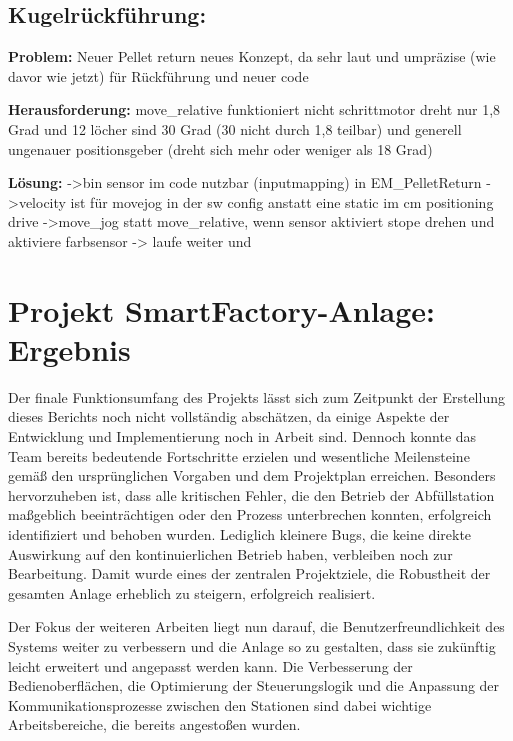 \subsection{Kugelrückführung:}
\textbf{Problem:}
Neuer Pellet return neues Konzept, da sehr laut und umpräzise (wie davor wie jetzt) für Rückführung und neuer code

\textbf{Herausforderung:}
move_relative funktioniert nicht schrittmotor dreht nur 1,8 Grad und 12 löcher sind 30 Grad (30 nicht durch 1,8 teilbar) und generell ungenauer positionsgeber (dreht sich mehr oder weniger als 18 Grad)

\textbf{Lösung:}
->bin sensor im code nutzbar (inputmapping) in EM_PelletReturn
->velocity ist für movejog in der sw config anstatt eine static im cm positioning drive
->move_jog statt move_relative, wenn sensor aktiviert stope drehen und aktiviere farbsensor -> laufe weiter und 
\section{Projekt SmartFactory-Anlage: Ergebnis}\label{sec:Projekt SmartFactory-Anlage: Ergebnis}

Der finale Funktionsumfang des Projekts lässt sich zum Zeitpunkt der Erstellung dieses Berichts noch nicht vollständig abschätzen, da einige 
Aspekte der Entwicklung und Implementierung noch in Arbeit sind. Dennoch konnte das Team bereits bedeutende Fortschritte erzielen und wesentliche 
Meilensteine gemäß den ursprünglichen Vorgaben und dem Projektplan erreichen. Besonders hervorzuheben ist, dass alle kritischen Fehler, die den 
Betrieb der Abfüllstation maßgeblich beeinträchtigen oder den Prozess unterbrechen konnten, erfolgreich identifiziert und behoben wurden. 
Lediglich kleinere Bugs, die keine direkte Auswirkung auf den kontinuierlichen Betrieb haben, verbleiben noch zur Bearbeitung. Damit wurde 
eines der zentralen Projektziele, die Robustheit der gesamten Anlage erheblich zu steigern, erfolgreich realisiert.

Der Fokus der weiteren Arbeiten liegt nun darauf, die Benutzerfreundlichkeit des Systems weiter zu verbessern und die Anlage so zu gestalten, 
dass sie zukünftig leicht erweitert und angepasst werden kann. Die Verbesserung der Bedienoberflächen, die Optimierung der Steuerungslogik und 
die Anpassung der Kommunikationsprozesse zwischen den Stationen sind dabei wichtige Arbeitsbereiche, die bereits angestoßen wurden.

